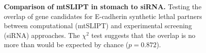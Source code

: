 \begin{figure}[!ht]
  \centering
    \caption[Comparison of mtSLIPT in stomach to siRNA]{\small \textbf{Comparison of mtSLIPT in stomach to siRNA.} Testing the overlap of gene candidates for E-cadherin synthetic lethal partners between computational (mtSLIPT) and experimental screening (siRNA) approaches. The $\chi^2$ test suggests that the overlap is no more than would be expected by chance ($p = 0.872$). %
}
\label{fig:Venn_allgenes_stad_mtSL}
\end{figure}


